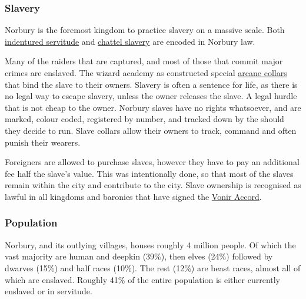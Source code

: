\subsubsection{Slavery}

Norbury is the foremost kingdom to practice slavery on a massive scale. Both
\hyperref[sec:Indentured Servitude]{indentured servitude} and
\hyperref[sec:Unregulated Slavery]{chattel slavery} are encoded in Norbury
law.

Many of the raiders that are captured, and most of those that commit major
crimes are enslaved. The wizard academy as constructed special
\hyperref[sec:Slave Band]{arcane collars} that bind the slave to their
owners. Slavery is often a sentence for life, as there is no legal way to
escape slavery, unless the owner releases the slave. A legal hurdle that is
not cheap to the owner. Norbury slaves have no rights whatsoever, and are
marked, colour coded, registered by number, and tracked down by the
 should they decide to run. Slave collars allow
their owners to track, command and often punish their wearers.

Foreigners are allowed to purchase slaves, however they have to pay an
additional fee half the slave's value. This was intentionally done, so that
most of the slaves remain within the city and contribute to the city. Slave
ownership is recognised as lawful in all kingdoms and baronies that have
signed the \hyperref[sec:Vonir Accord]{Vonir Accord}.

\subsubsection{Population}

Norbury, and its outlying villages, houses roughly 4 million people. Of which
the vast majority are human and deepkin (39\%), then elves (24\%) followed by
dwarves (15\%) and half races (10\%). The rest (12\%) are beast races, almost
all of which are enslaved. Roughly 41\% of the entire population is either
currently enslaved or in servitude.

